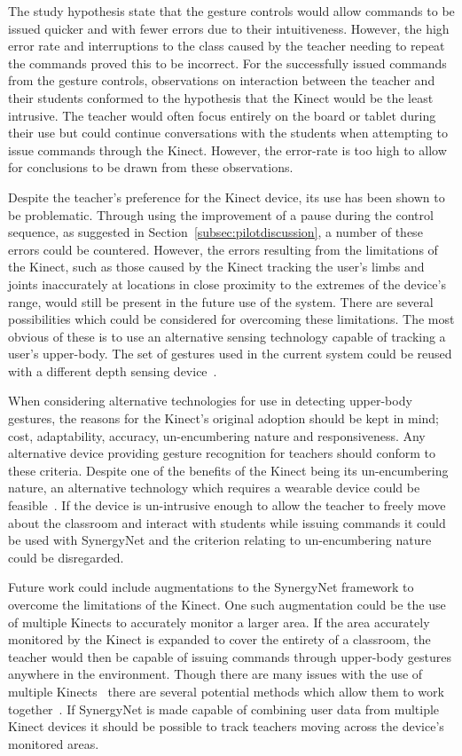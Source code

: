 \documentclass[link]{IWCOMP}
\begin{document}
The study hypothesis state that the gesture controls would allow commands to be issued quicker and with fewer errors due to their intuitiveness.
However, the high error rate and interruptions to the class caused by the teacher needing to repeat the commands proved this to be incorrect.
For the successfully issued commands from the gesture controls, observations on interaction between the teacher and their students conformed to the hypothesis that the Kinect would be the least intrusive.
The teacher would often focus entirely on the board or tablet during their use but could continue conversations with the students when attempting to issue commands through the Kinect.
However, the error-rate is too high to allow for conclusions to be drawn from these observations.

Despite the teacher's preference for the Kinect device, its use has been shown to be problematic.
Through using the improvement of a pause during the control sequence, as suggested in Section~\ref{subsec:pilotdiscussion}, a number of these errors could be countered.
However, the errors resulting from the limitations of the Kinect, such as those caused by the Kinect tracking the user's limbs and joints inaccurately at locations in close proximity to the extremes of the device's range, would still be present in the future use of the system.
There are several possibilities which could be considered for overcoming these limitations.
The most obvious of these is to use an alternative sensing technology capable of tracking a user's upper-body.
The set of gestures used in the current system could be reused with a different depth sensing device~\cite{Kean2011}.

When considering alternative technologies for use in detecting upper-body gestures, the reasons for the Kinect's original adoption should be kept in mind; cost, adaptability, accuracy, un-encumbering nature and responsiveness.
Any alternative device providing gesture recognition for teachers should conform to these criteria.
Despite one of the benefits of the Kinect being its un-encumbering nature, an alternative technology which requires a wearable device could be feasible~\cite{Rekimotoa,Zhu2011}.
If the device is un-intrusive enough to allow the teacher to freely move about the classroom and interact with students while issuing commands it could be used with SynergyNet and the criterion relating to un-encumbering nature could be disregarded. 

Future work could include augmentations to the SynergyNet framework to overcome the limitations of the Kinect.
One such augmentation could be the use of multiple Kinects to accurately monitor a larger area.
If the area accurately monitored by the Kinect is expanded to cover the entirety of a classroom, the teacher would then be capable of issuing commands through upper-body gestures anywhere in the environment.
Though there are many issues with the use of multiple Kinects~\cite{Maimone2012,Schroder2011} there are several potential methods which allow them to work together~\cite{Wang2012}.
If SynergyNet is made capable of combining user data from multiple Kinect devices it should be possible to track teachers moving across the device's monitored areas.
\end{document}
